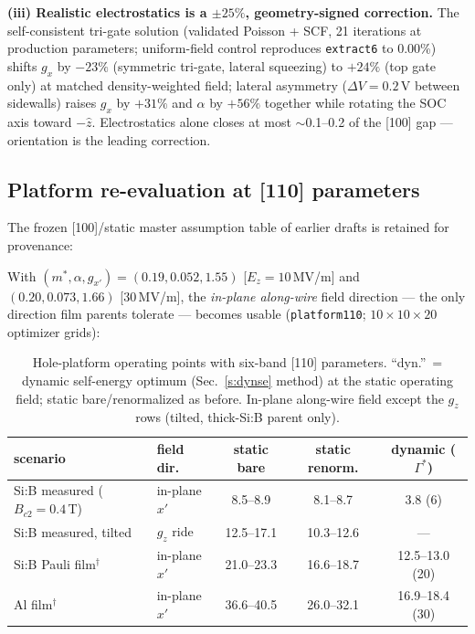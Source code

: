\documentclass[11pt]{article}
\begin{document}
\textbf{(iii) Realistic electrostatics is a $\pm25\%$, geometry-signed
correction.} The self-consistent tri-gate solution (validated Poisson +
SCF, 21 iterations at production parameters; uniform-field control
reproduces \texttt{extract6} to 0.00\%) shifts $g_x$ by $-23\%$ (symmetric
tri-gate, lateral squeezing) to $+24\%$ (top gate only) at matched
density-weighted field; lateral asymmetry ($\Delta V = 0.2$\,V between
sidewalls) raises $g_x$ by $+31\%$ and $\alpha$ by $+56\%$ together while
rotating the SOC axis toward $-\hat z$. Electrostatics alone closes at most
$\sim$0.1--0.2 of the [100] gap --- orientation is the leading correction.

\subsection{Platform re-evaluation at [110] parameters}
\label{s:plat110}
The frozen [100]/static master assumption table of earlier drafts is
retained for provenance:



With $(m^*, \alpha, g_{x'}) = (0.19, 0.052, 1.55)$ [$E_z = 10$\,MV/m] and
$(0.20, 0.073, 1.66)$ [30\,MV/m], the \emph{in-plane along-wire} field
direction --- the only direction film parents tolerate --- becomes usable
(\texttt{platform110}; $10\times10\times20$ optimizer grids):

\begin{table}[h]\centering\small
\caption{Hole-platform operating points with six-band [110] parameters.
``dyn.''\ = dynamic self-energy optimum (Sec.~\ref{s:dynse} method) at the
static operating field; static bare/renormalized as before. In-plane
along-wire field except the $g_z$ rows (tilted, thick-Si:B parent only).}
\label{t:plat110}
\begin{tabular}{llccc}
\toprule
scenario & field dir. & static bare & static renorm. & dynamic
($\Gamma^*$)\\
\midrule
Si:B measured ($B_{c2}{=}0.4$\,T) & in-plane $x'$ & 8.5--8.9 & 8.1--8.7 &
3.8 (6)\\
Si:B measured, tilted & $g_z$ ride & 12.5--17.1 & 10.3--12.6 & ---\\
Si:B Pauli film$^{\dagger}$ & in-plane $x'$ & 21.0--23.3 & 16.6--18.7 &
12.5--13.0 (20)\\
Al film$^{\dagger}$ & in-plane $x'$ & 36.6--40.5 & 26.0--32.1 &
16.9--18.4 (30)\\
\bottomrule
\end{tabular}
\end{table}
\end{document}
